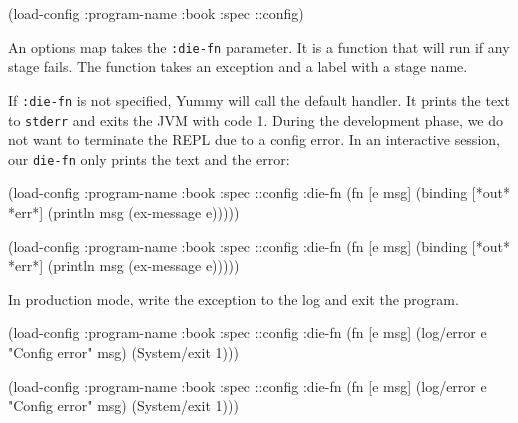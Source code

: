\begin{clojure}
(load-config {:program-name :book
              :spec ::config})
\end{clojure}


An options map takes the \verb|:die-fn| parameter. It is a function that will run if any stage fails. The function takes an exception and a label with a stage name.


If \verb|:die-fn| is not specified, Yummy will call the default handler. It prints the text to \verb|stderr| and exits the JVM with code 1. During the development phase, we do not want to terminate the REPL due to a config error. In an interactive session, our \verb|die-fn| only prints the text and the error:

\ifnarrow

\begin{clojure}
(load-config
 {:program-name :book
  :spec ::config
  :die-fn (fn [e msg]
            (binding [*out* *err*]
              (println msg
                (ex-message e))))})
\end{clojure}

\else

\begin{clojure}
(load-config
 {:program-name :book
  :spec ::config
  :die-fn (fn [e msg]
            (binding [*out* *err*]
              (println msg (ex-message e))))})
\end{clojure}

\fi

\noindent
In production mode, write the exception to the log and exit the program.


\ifnarrow

\begin{clojure}
(load-config
 {:program-name :book
  :spec ::config
  :die-fn (fn [e msg]
            (log/error e
              "Config error" msg)
            (System/exit 1))})
\end{clojure}

\else

\begin{clojure}
(load-config
 {:program-name :book
  :spec ::config
  :die-fn (fn [e msg]
            (log/error e "Config error" msg)
            (System/exit 1))})
\end{clojure}

\fi


